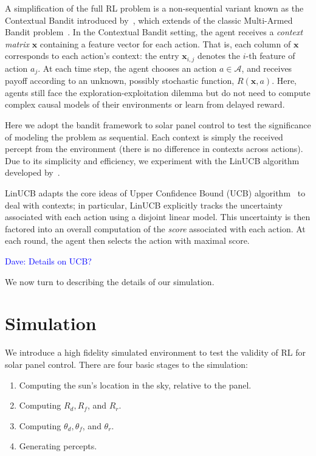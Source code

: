 \documentclass{article}
\newcommand{\dnote}[1]{\textcolor{blue}{Dave: #1}}
\newcommand{\mc}{\mathcal}
\begin{document}
{A simplification of the full RL problem is a non-sequential variant known as the Contextual Bandit introduced by~\citet{wang2005bandit}, which extends of the classic Multi-Armed Bandit problem~\cite{gittins1979bandit}. In the Contextual Bandit setting, the agent receives a {\it context matrix} $\bm{x}$ containing a feature vector for each action. That is, each column of $\bm{x}$ corresponds to each action's context: the entry $\bm{x}_{i,j}$ denotes the $i$-th feature of action $a_j$. At each time step, the agent chooses an action $a \in \mc{A}$, and receives payoff according to an unknown, possibly stochastic function, $R(\bm{x},a)$. Here, agents still face the exploration-exploitation dilemma but do not need to compute complex causal models of their environments or learn from delayed reward.

Here we adopt the bandit framework to solar panel control to test the significance of modeling the problem as sequential. Each context is simply the received percept from the environment (there is no difference in contexts across actions). Due to its simplicity and efficiency, we experiment with the LinUCB algorithm developed by~\citet{li2010contextual}.

LinUCB adapts the core ideas of Upper Confidence Bound (UCB) algorithm~\cite{auer2002finite} to deal with contexts; in particular, LinUCB explicitly tracks the uncertainty associated with each action using a disjoint linear model. This uncertainty is then factored into an overall computation of the {\it score} associated with each action. At each round, the agent then selects the action with maximal score.

\dnote{Details on UCB?}


We now turn to describing the details of our simulation.

\section{Simulation}
\label{sec:simulation}

We introduce a high fidelity simulated environment to test the validity of RL for solar panel control. There are four basic stages to the simulation:
\begin{enumerate}
\item Computing the sun's location in the sky, relative to the panel.
\item Computing $R_d, R_f$, and $R_r$.
\item Computing $\theta_d, \theta_f$, and $\theta_r$.
\item Generating percepts.
\end{enumerate}

}
\end{document}
